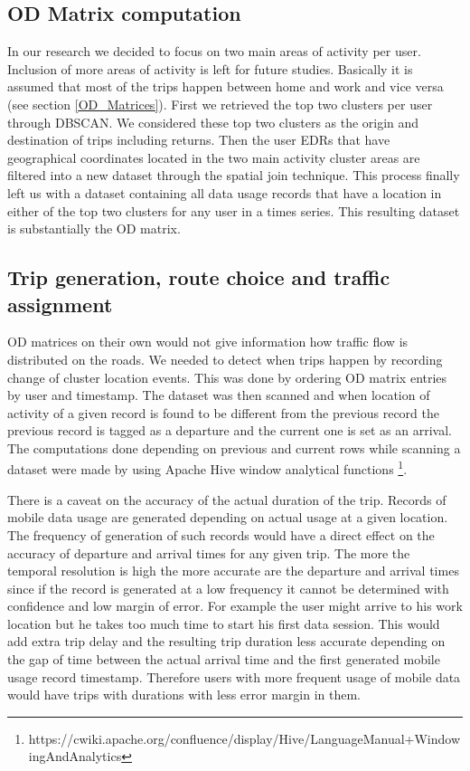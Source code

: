 \documentclass[12pt, a4paper]{report}
\theoremstyle{definition}
\theoremstyle{definition}%
\theoremstyle{definition}%
\theoremstyle{definition}%
\theoremstyle{definition}%
\theoremstyle{definition}%
\begin{document}
 

\subsection{OD Matrix computation}
In our research we decided to focus on two main areas of activity per user. Inclusion of more areas of activity is left for future studies. Basically it is assumed that most of the trips happen between home and work and vice versa (see section \ref{OD_Matrices}). First we retrieved the top two clusters per user through DBSCAN. We considered these top two clusters as the origin and destination of trips including returns. Then the user EDRs that have geographical coordinates located in the two main activity cluster areas are filtered into a new dataset through the spatial join technique. This process finally left us with a dataset containing all data usage records that have a location in either of the top two clusters for any user in a times series. This resulting dataset is substantially the OD matrix.

\subsection{Trip generation, route choice and traffic assignment}

OD matrices on their own would not give information how traffic flow is distributed on the roads. We needed to detect when trips happen by recording change of cluster location events. This was done by ordering OD matrix entries by user and timestamp. The dataset was then scanned and when location of activity of a given record is found to be different from the previous record the previous record is tagged as a departure and the current one is set as an arrival. The computations done depending on previous and current rows while scanning a dataset were made by using Apache Hive window analytical functions \footnote{https://cwiki.apache.org/confluence/display/Hive/LanguageManual+WindowingAndAnalytics}. 


There is a caveat on the accuracy of the actual duration of the trip. Records of mobile data usage are generated depending on actual usage at a given location. The frequency of generation of such records would have a direct effect on the accuracy of departure and arrival times for any given trip. The more the temporal resolution is high the more accurate are the departure and arrival times since if the record is generated at a low frequency it cannot be determined with confidence and low margin of error. For example the user might arrive to his work location but he takes too much time to start his first data session. This would add extra trip delay and the resulting trip duration less accurate depending on the gap of time between the actual arrival time and the first generated mobile usage record timestamp. Therefore users with more frequent usage of mobile data would have trips with durations with less error margin in them.   
\end{document}
